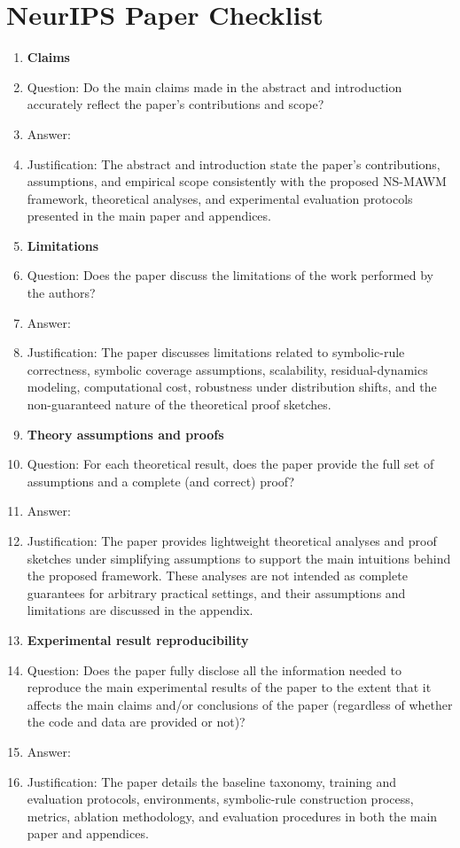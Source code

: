 \section*{NeurIPS Paper Checklist}

\begin{enumerate}

      \item {\bf Claims}
      \item[] Question: Do the main claims made in the abstract and introduction accurately reflect the paper's contributions and scope?
      \item[] Answer: \answerYes{}
      \item[] Justification: The abstract and introduction state the paper's contributions, assumptions, and empirical scope consistently with the proposed NS-MAWM framework, theoretical analyses, and experimental evaluation protocols presented in the main paper and appendices.

      \item {\bf Limitations}
      \item[] Question: Does the paper discuss the limitations of the work performed by the authors?
      \item[] Answer: \answerYes{}
      \item[] Justification: The paper discusses limitations related to symbolic-rule correctness, symbolic coverage assumptions, scalability, residual-dynamics modeling, computational cost, robustness under distribution shifts, and the non-guaranteed nature of the theoretical proof sketches.

      \item {\bf Theory assumptions and proofs}
      \item[] Question: For each theoretical result, does the paper provide the full set of assumptions and a complete (and correct) proof?
      \item[] Answer: \answerYes{}
      \item[] Justification: The paper provides lightweight theoretical analyses and proof sketches under simplifying assumptions to support the main intuitions behind the proposed framework. These analyses are not intended as complete guarantees for arbitrary practical settings, and their assumptions and limitations are discussed in the appendix.

      \item {\bf Experimental result reproducibility}
      \item[] Question: Does the paper fully disclose all the information needed to reproduce the main experimental results of the paper to the extent that it affects the main claims and/or conclusions of the paper (regardless of whether the code and data are provided or not)?
      \item[] Answer: \answerYes{}
      \item[] Justification: The paper details the baseline taxonomy, training and evaluation protocols, environments, symbolic-rule construction process, metrics, ablation methodology, and evaluation procedures in both the main paper and appendices.


\end{enumerate}
